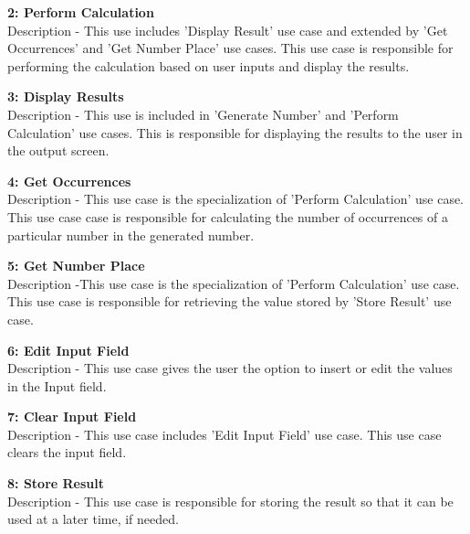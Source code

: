 \documentclass[paper=a4, fontsize=11pt]{report}
\numberwithin{equation}{section}		%
\numberwithin{figure}{section}			%
\numberwithin{table}{section}				%
\begin{document}
\begin{flushleft}
\textbf{2: Perform Calculation }
\\Description - This use includes 'Display Result' use case and extended by 'Get Occurrences' and 'Get Number Place' use cases. This use case is responsible for performing the calculation based on user inputs and display the results.
\end{flushleft}

\begin{flushleft}
\textbf{3: Display Results }
\\Description - This use is included in 'Generate Number' and 'Perform Calculation' use cases. This is responsible for displaying the results to the user in the output screen.
\end{flushleft}

\begin{flushleft}
\textbf{4: Get Occurrences}
\\Description - This use case is the specialization of 'Perform Calculation' use case. This use case case is responsible for calculating the number of occurrences of a particular number in the generated number.
\end{flushleft}

\begin{flushleft}
\textbf{5: Get Number Place }
\\Description -This use case is the specialization of 'Perform Calculation' use case. This use case is responsible for retrieving the value stored by 'Store Result' use case.
\end{flushleft}

\begin{flushleft}
\textbf{6: Edit Input Field }
\\Description - This use case gives the user the option to insert or edit the values in the Input field.
\end{flushleft}

\begin{flushleft}
\textbf{7: Clear Input Field  }
\\Description - This use case includes 'Edit Input Field' use case. This use case clears the input field.
\end{flushleft}

\begin{flushleft}
\textbf{8: Store Result }
\\Description - This use case is responsible for storing the result so that it can be used at a later time, if needed.
\end{flushleft}
\end{document}
